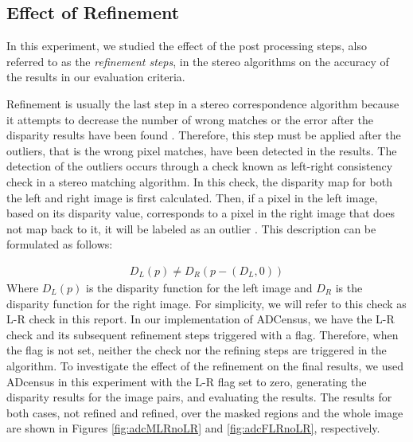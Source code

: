 \subsection{Effect of Refinement}
In this experiment, we studied the effect of the post processing steps, also referred to as the \textit{refinement steps}, 
in the stereo algorithms on the accuracy of the results in our evaluation criteria. 

Refinement is usually the last step in a stereo correspondence algorithm because it attempts to decrease the 
number of wrong matches or the error after the disparity results have been found \cite{sch02}. Therefore, this step must be applied after the outliers, that is the wrong pixel matches, 
have been detected in the results.
The detection of the outliers occurs through a check known as left-right consistency check in a stereo matching algorithm. In this check, the disparity map for both
the left and right image is first calculated. Then, if a pixel in the left image, based on its disparity value, corresponds to a pixel in the right image
that does not map back to it, it will be labeled as an outlier \cite{sch02}. This description can be formulated as follows:

\begin{align}
D_{L}(p) \neq D_{R}(p-(D_{L},0))
\end{align}
\noindent
Where $D_{L}(p)$ is the disparity function for the left image and $D_{R}$ is the disparity function for the right image. \newline
For simplicity, we will refer
to this check as L-R check in this report.
In our implementation of ADCensus, we have the L-R check and its subsequent refinement steps triggered with a flag.
Therefore, when the flag is not set, neither the check nor the refining steps are triggered in the algorithm.
To investigate the effect of the refinement on the final results, we used 
ADcensus in this experiment with the L-R flag set to zero, generating the disparity results for the image pairs, and evaluating the results.
The results for both cases, not refined and refined, over the masked regions and the whole image are shown in Figures \ref{fig:adcMLRnoLR} and \ref{fig:adcFLRnoLR}, respectively.

